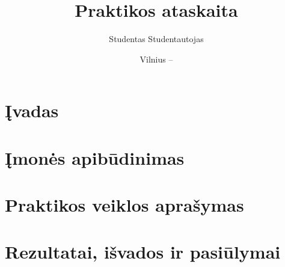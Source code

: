 \documentclass{VUMIFPSataskaita}
\title{Praktikos ataskaita}
\author{Studentas Studentautojas}
\date{Vilnius – \the\year}
\begin{document}
\maketitle
\addtocounter{page}{1}
\tableofcontents

\section{Įvadas}

\section{Įmonės apibūdinimas}

\section{Praktikos veiklos aprašymas}

\section{Rezultatai, išvados ir pasiūlymai}
		
\printbibliography[heading=bibintoc]
\end{document}
